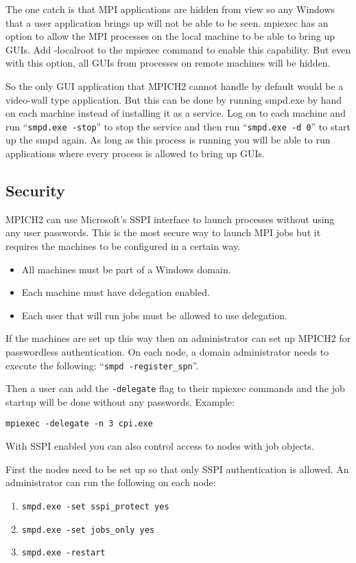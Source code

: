 \documentclass[dvipdfm,11pt]{article}
\begin{document}
The one catch is that MPI applications are hidden from view so any Windows that a user 
application brings up will not be able to be seen.  mpiexec has an option to allow the MPI 
processes on the local machine to be able to bring up GUIs.  Add -localroot to the mpiexec
command to enable this capability.  But even with this option, all GUIs from processes on 
remote machines will be hidden.

So the only GUI application that MPICH2 cannot handle by default would be a video-wall type
application.  But this can be done by running smpd.exe by hand on each machine instead of
installing it as a service.  Log on to each machine and run ``\texttt{smpd.exe -stop}'' 
to stop the service and then run ``\texttt{smpd.exe -d 0}'' to start up the smpd again.  
As long as this process is running you will be able to run applications where every process 
is allowed to bring up GUIs.

\subsection{Security}
MPICH2 can use Microsoft's SSPI interface to launch processes without using any user 
passwords.  This is the most secure way to launch MPI jobs but it requires the machines to be 
configured in a certain way.
\begin{itemize}
\item All machines must be part of a Windows domain.
\item Each machine must have delegation enabled.
\item Each user that will run jobs must be allowed to use delegation.
\end{itemize}

If the machines are set up this way then an administrator can set up MPICH2 for passwordless
authentication.  On each node, a domain administrator needs to execute the following:
``\texttt{smpd -register\_spn}''.

Then a user can add the \texttt{-delegate} flag to their mpiexec commands and the job startup 
will be done without any passwords.  Example:
\begin{verbatim}
mpiexec -delegate -n 3 cpi.exe
\end{verbatim}

With SSPI enabled you can also control access to nodes with job objects.

First the nodes need to be set up so that only SSPI authentication is allowed.  An administrator
can run the following on each node:
\begin{enumerate}
\item \texttt{smpd.exe -set sspi\_protect yes}
\item \texttt{smpd.exe -set jobs\_only yes}
\item \texttt{smpd.exe -restart}
\end{enumerate}
\end{document}
